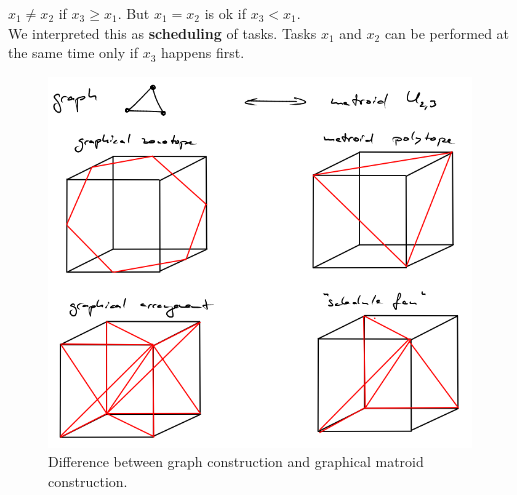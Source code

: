 \documentclass[12pt,reqno]{amsart}
\numberwithin{definition}{section}
\begin{document}



$x_1 \neq x_2$ if $x_3 \geq x_1$.  But $x_1 = x_2$ is ok if $x_3 < x_1$.\\

We interpreted this as {\bf{scheduling}} of tasks.  Tasks $x_1$ and
$x_2$ can be performed  at the same time only if $x_3$ happens first.

\begin{figure}[h]
\includegraphics[width=13cm]{graph-matroid}
\caption{Difference between graph construction and graphical matroid construction.}
\end{figure}
\end{document}
